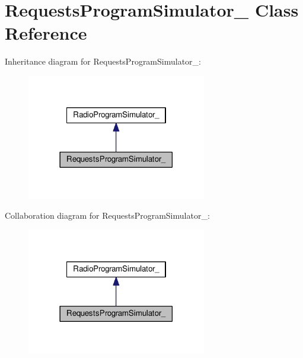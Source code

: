 \hypertarget{class_requests_program_simulator__}{}\section{Requests\+Program\+Simulator\+\_\+ Class Reference}
\label{class_requests_program_simulator__}


Inheritance diagram for Requests\+Program\+Simulator\+\_\+\+:
\nopagebreak
\begin{figure}[H]
\begin{center}
\leavevmode
\includegraphics[width=222pt]{class_requests_program_simulator____inherit__graph}
\end{center}
\end{figure}


Collaboration diagram for Requests\+Program\+Simulator\+\_\+\+:
\nopagebreak
\begin{figure}[H]
\begin{center}
\leavevmode
\includegraphics[width=222pt]{class_requests_program_simulator____coll__graph}
\end{center}
\end{figure}
